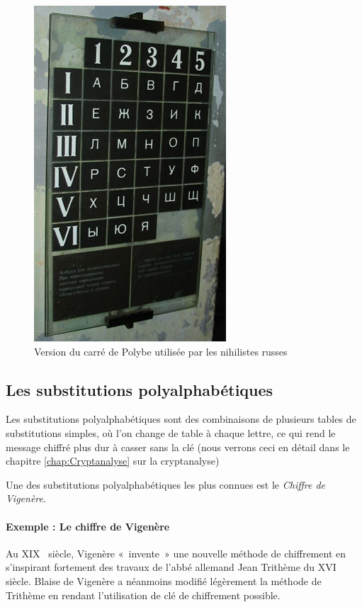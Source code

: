 \begin{figure}[h]
  \begin{center}
    \includegraphics[scale=1.5]{images/Nihilistes.jpg}
  \end{center}
  \caption{Version du carré de Polybe utilisée par les nihilistes
    russes}
  \label{fig:Nihilistes}
\end{figure}

\subsection{Les substitutions polyalphabétiques\label{SubstitutionPolyalphabetique}}
Les substitutions polyalphabétiques sont des combinaisons de plusieurs
tables de substitutions simples, où l'on change de table à chaque
lettre, ce qui rend le message chiffré plus dur à casser sans
la clé (nous verrons ceci en détail dans le chapitre
\ref{chap:Cryptanalyse} sur la cryptanalyse)

Une des substitutions polyalphabétiques les plus connues est le
\emph{Chiffre de Vigenère}.

\paragraph{Exemple : Le chiffre de Vigenère\label{syst:ChiffreVigenere}}
Au XIX\ieme~ siècle, Vigenère «~invente~» une nouvelle méthode de
chiffrement en s'inspirant fortement des travaux de l'abbé allemand
Jean Trithème du XVI\ieme~ siècle. Blaise de Vigenère a néanmoins
modifié légèrement la méthode de Trithème en rendant l'utilisation de
clé de chiffrement possible.\\

